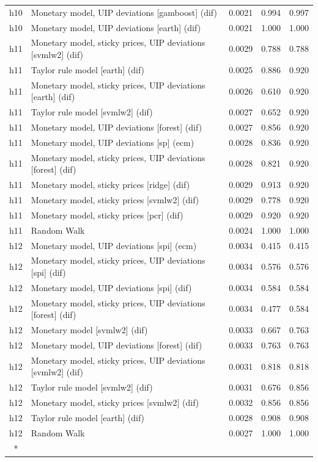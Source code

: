 \begin{ThreePartTable}
\begin{longtable}[t]{cp{5.5cm}ccc}
h10 & \raggedright Monetary model, UIP deviations [gamboost] (dif) & 0.0021 & 0.994 & 0.997\\
h10 & \raggedright Monetary model, UIP deviations [earth] (dif) & 0.0021 & 1.000 & 1.000\\
\addlinespace
h11 & \raggedright Monetary model, sticky prices, UIP deviations [svmlw2] (dif) & 0.0029 & 0.788 & 0.788\\
h11 & \raggedright Taylor rule model [earth] (dif) & 0.0025 & 0.886 & 0.920\\
h11 & \raggedright Monetary model, sticky prices, UIP deviations [earth] (dif) & 0.0026 & 0.610 & 0.920\\
h11 & \raggedright Taylor rule model [svmlw2] (dif) & 0.0027 & 0.652 & 0.920\\
h11 & \raggedright Monetary model, UIP deviations [forest] (dif) & 0.0027 & 0.856 & 0.920\\
h11 & \raggedright Monetary model, UIP deviations [sp] (ecm) & 0.0028 & 0.836 & 0.920\\
h11 & \raggedright Monetary model, sticky prices, UIP deviations [forest] (dif) & 0.0028 & 0.821 & 0.920\\
h11 & \raggedright Monetary model, sticky prices [ridge] (dif) & 0.0029 & 0.913 & 0.920\\
h11 & \raggedright Monetary model, sticky prices [svmlw2] (dif) & 0.0029 & 0.778 & 0.920\\
h11 & \raggedright Monetary model, sticky prices [pcr] (dif) & 0.0029 & 0.920 & 0.920\\
h11 & \raggedright Random Walk & 0.0024 & 1.000 & 1.000\\
\addlinespace
h12 & \raggedright Monetary model, UIP deviations [spi] (ecm) & 0.0034 & 0.415 & 0.415\\
h12 & \raggedright Monetary model, sticky prices, UIP deviations [spi] (dif) & 0.0034 & 0.576 & 0.576\\
h12 & \raggedright Monetary model, UIP deviations [spi] (dif) & 0.0034 & 0.584 & 0.584\\
h12 & \raggedright Monetary model, sticky prices, UIP deviations [forest] (dif) & 0.0034 & 0.477 & 0.584\\
h12 & \raggedright Monetary model [svmlw2] (dif) & 0.0033 & 0.667 & 0.763\\
h12 & \raggedright Monetary model, UIP deviations [forest] (dif) & 0.0033 & 0.763 & 0.763\\
h12 & \raggedright Monetary model, sticky prices, UIP deviations [svmlw2] (dif) & 0.0031 & 0.818 & 0.818\\
h12 & \raggedright Taylor rule model [svmlw2] (dif) & 0.0031 & 0.676 & 0.856\\
h12 & \raggedright Monetary model, sticky prices [svmlw2] (dif) & 0.0032 & 0.856 & 0.856\\
h12 & \raggedright Taylor rule model [earth] (dif) & 0.0028 & 0.908 & 0.908\\
h12 & \raggedright Random Walk & 0.0027 & 1.000 & 1.000\\*
\end{longtable}
\end{ThreePartTable}
\endgroup{}
